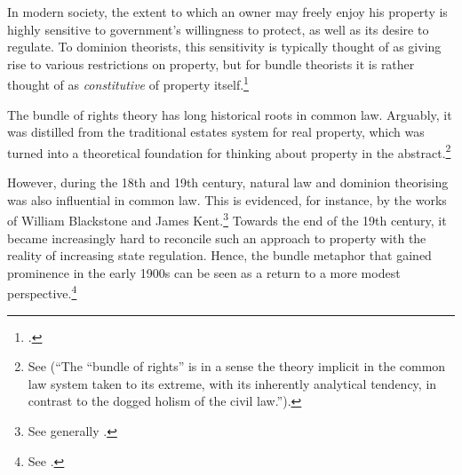 In modern society, the extent to which an owner may freely enjoy his property is highly sensitive to government's willingness to protect, as well as its desire to regulate. To dominion theorists, this sensitivity is typically thought of as giving rise to various restrictions on property, but for bundle theorists it is rather thought of as {\it constitutive} of property itself.\footcite[7]{chang12} 

The bundle of rights theory has long historical roots in common law. Arguably, it was distilled from the traditional estates system for real property, which was turned into a theoretical foundation for thinking about property in the abstract.\footnote{See \cite[7]{chang12}   
(``The ``bundle of rights'' is in a sense the theory implicit in the common law system taken to its extreme, with its inherently analytical tendency, in contrast to the dogged holism of the civil law.'').}

However, during the 18th and 19th century, natural law and dominion theorising was also influential in common law. This is evidenced, for instance, by the works of William Blackstone and James Kent.\footnote{See generally \cite{blackstone79b,kent27}.} Towards the end of the 19th century, it became increasingly hard to reconcile such an approach to property with the reality of increasing state regulation. Hence, the bundle metaphor that gained prominence in the early 1900s can be seen as a return to a more modest perspective.\footnote{See \cite[195]{klein11}.}

